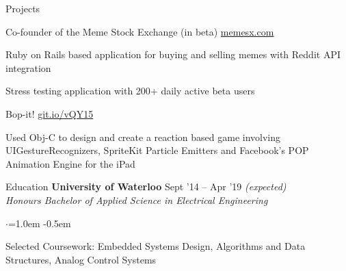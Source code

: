 \documentclass{resume} %
\begin{document}
	
	
	\begin{rSection}{Projects}
		\begin{rSubsection}{Co-founder of the Meme Stock Exchange (in beta)}
			{\href{https://memesx.com}{memesx.com}}
			{}{}
			
			\item Ruby on Rails based application for buying and selling memes with Reddit API integration
			\item Stress testing application with 200+ daily active beta users
			
		\end{rSubsection}
		\begin{rSubsection}{Bop-it!}
			{\href{https://git.io/vQY15}{git.io/vQY15}}
			{}{}
			
			\item Used Obj-C to design and create a reaction based game involving UIGestureRecognizers, SpriteKit Particle Emitters and Facebook's POP Animation Engine for the iPad
		\end{rSubsection}
		
		
		
		
	\end{rSection}
	
	
	\begin{rSection}{Education}
		{\bf University of Waterloo} \hfill {Sept '14 -- Apr '19 \em (expected)} \\
		{\em Honours Bachelor of Applied Science in Electrical Engineering} 
		\begin{list}{$\cdot$}{\leftmargin=1.0em}
			\itemsep -0.5em \vspace{-0.5em}
			\item Selected Coursework: Embedded Systems Design, Algorithms and Data Structures, Analog Control Systems
		\end{list}
		\vspace{0.5em}
	\end{rSection}
	
\end{document}
